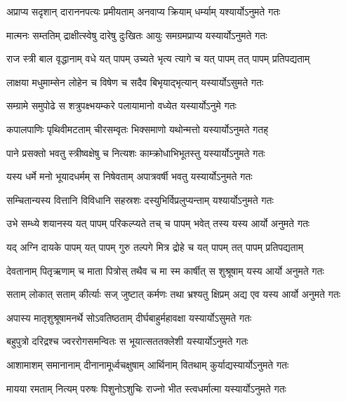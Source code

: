 \twolineshloka
{अप्राप्य सदृशान् दाराननपत्यः प्रमीयताम्}
{अनवाप्य क्रियाम् धर्म्याम् यश्यार्योऽनुमते गतः} %

\twolineshloka
{मात्मनः सम्ततिम् द्राक्षीत्स्वेषु दारेषु दुःखितः}
{आयुः समग्रमप्राप्य यस्यार्योऽनुमते गतः} %

\twolineshloka
{राज स्त्री बाल वृद्धानाम् वधे यत् पापम् उच्यते}
{भृत्य त्यागे च यत् पापम् तत् पापम् प्रतिपद्यताम्} %

\twolineshloka
{लाक्षया मधुमाम्सेन लोहेन च विषेण च}
{सदैव बिभृयाद्भृत्यान् यस्यार्योऽसुमते गतः} %

\twolineshloka
{सम्ग्रामे समुपोढे स शत्रुपक्ष्भयम्करे}
{पलायामानो वध्येत यस्यार्योऽनुमे गतः} %

\twolineshloka
{कपालपाणिः पृथिवीमटताम् चीरसम्वृतः}
{भिक्समाणो यथोन्मत्तो यस्यार्योऽनुमते गतह्} %

\twolineshloka
{पाने प्रसक्तो भवतु स्त्रीष्वक्षेषु च नित्यशः}
{काम्क्रोधाभिभूतस्तु यस्यार्योऽनुमते गतः} %

\twolineshloka
{यस्य धर्मे मनो भूयादधर्मम् स निषेवताम्}
{अपात्रवर्षी भवतु यस्यार्योऽनुमते गतः} %

\twolineshloka
{सम्चितान्यस्य वित्तानि विविधानि सहस्रशः}
{दस्युभिर्विप्रलुप्यन्ताम् यश्यार्योऽनुमते गतः} %

\twolineshloka
{उभे सम्ध्ये शयानस्य यत् पापम् परिकल्प्यते}
{तच् च पापम् भवेत् तस्य यस्य आर्यो अनुमते गतः} %

\twolineshloka
{यद् अग्नि दायके पापम् यत् पापम् गुरु तल्पगे}
{मित्र द्रोहे च यत् पापम् तत् पापम् प्रतिपद्यताम्} %

\twolineshloka
{देवतानाम् पितृऋणाम् च माता पित्रोस् तथैव च}
{मा स्म कार्षीत् स शुश्रूषाम् यस्य आर्यो अनुमते गतः} %

\twolineshloka
{सताम् लोकात् सताम् कीर्त्याः सज् जुष्टात् कर्मणः तथा}
{भ्रश्यतु क्षिप्रम् अद्य एव यस्य आर्यो अनुमते गतः} %

\twolineshloka
{अपास्य मातृशुश्रूषामनर्थे सोऽवतिष्ठताम्}
{दीर्घबाहुर्महावक्षा यस्यार्योऽसुमते गतः} %

\twolineshloka
{बहुपुत्रो दरिद्रश्च ज्वररोगसमन्वितः}
{स भूयात्सततक्लेशी यस्यार्योऽनुमते गतः} %

\twolineshloka
{आशामाशम् समानानाम् दीनानामूर्ध्वचक्षुषाम्}
{आर्थिनाम् वितथाम् कुर्याद्यस्यार्योऽनुमते गतः} %

\twolineshloka
{मायया रमताम् नित्यम् परुषः पिशुनोऽशुचिः}
{राज्नो भीत स्त्वधर्मात्मा यस्यार्योऽनुमते गतः} %

